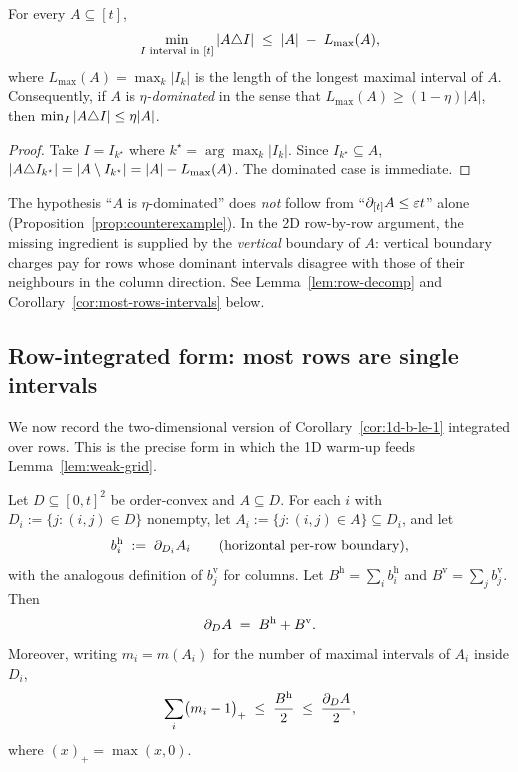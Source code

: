 \begin{corollary}\label{cor:1d-best-interval}
For every $A \subseteq [t]$,
\[
\min_{I \text{ interval in } [t]} |A \triangle I| \;\le\; |A| \;-\; L_{\max}(A),
\]
where $L_{\max}(A) = \max_k |I_k|$ is the length of the longest
maximal interval of $A$. Consequently, if $A$ is
\emph{$\eta$-dominated} in the sense that $L_{\max}(A) \ge (1 -
\eta)|A|$, then $\min_{I}|A \triangle I| \le \eta|A|$.
\end{corollary}

\begin{proof}
Take $I = I_{k^\star}$ where $k^\star = \arg\max_k |I_k|$. Since
$I_{k^\star} \subseteq A$,
$|A \triangle I_{k^\star}| = |A \setminus I_{k^\star}| = |A| - L_{\max}(A)$.
The dominated case is immediate.
\end{proof}

\begin{remark}\label{rem:downstream-form}
The hypothesis ``$A$ is $\eta$-dominated'' does \emph{not} follow from
``$\partial_{[t]} A \le \varepsilon t$'' alone
(Proposition~\ref{prop:counterexample}). In the 2D row-by-row
argument, the missing ingredient is supplied by the
\emph{vertical} boundary of $A$: vertical boundary charges pay for
rows whose dominant intervals disagree with those of their neighbours
in the column direction. See
Lemma~\ref{lem:row-decomp} and Corollary~\ref{cor:most-rows-intervals}
below.
\end{remark}

\subsection{Row-integrated form: most rows are single intervals}

We now record the two-dimensional version of Corollary~\ref{cor:1d-b-le-1}
integrated over rows. This is the precise form in which the 1D warm-up
feeds Lemma~\ref{lem:weak-grid}.

\begin{lemma}\label{lem:row-decomp}
Let $D \subseteq [0,t]^2$ be order-convex and $A \subseteq D$. For
each $i$ with $D_i := \{j : (i,j) \in D\}$ nonempty, let
$A_i := \{j : (i,j) \in A\} \subseteq D_i$, and let
\[
b_i^{\mathrm h} \;:=\; \partial_{D_i} A_i
\qquad(\text{horizontal per-row boundary}),
\]
with the analogous definition of $b_j^{\mathrm v}$ for columns. Let
$B^{\mathrm h} = \sum_i b_i^{\mathrm h}$ and $B^{\mathrm v} = \sum_j
b_j^{\mathrm v}$. Then
\[
\partial_D A \;=\; B^{\mathrm h} + B^{\mathrm v}.
\]
Moreover, writing $m_i = m(A_i)$ for the number of maximal intervals
of $A_i$ inside $D_i$,
\[
\sum_{i} \bigl(m_i - 1\bigr)_+ \;\le\; \frac{B^{\mathrm h}}{2} \;\le\; \frac{\partial_D A}{2},
\]
where $(x)_+ = \max(x, 0)$.
\end{lemma}

